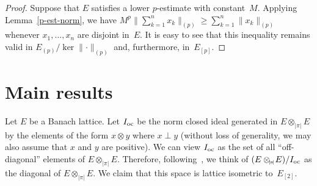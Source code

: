 \documentclass[12pt]{amsart}
\theoremstyle{plain}
\newtheorem{theorem}{Theorem}
\theoremstyle{definition}
\newcommand{\abs}[1]{\lvert#1\rvert}
\newcommand{\norm}[1]{\lVert#1\rVert}
\newcommand{\bignorm}[1]{\bigl\lVert#1\bigr\rVert}
\renewcommand{\ge}{\geqslant}
\def\api{{\abs{\!\pi\!}}}
\def\ftp{\otimes_{\!\scriptscriptstyle\api}\!}
\def\Ioc{I_{\rm oc}}
\begin{document}
\begin{proof}
  Suppose that $E$ satisfies a lower $p$-estimate with constant~$M$.
  Applying Lemma~\ref{p-est-norm}, we have
  \begin{math}
    M^p\bignorm{\sum_{k=1}^nx_k}_{(p)}
    \ge\sum_{k=1}^n\norm{x_k}_{(p)}
  \end{math}
  whenever $x_1,\dots,x_n$ are disjoint in~$E$. It is easy to see that
  this inequality remains valid in $E_{(p)}/\ker\norm{\cdot}_{(p)}$
  and,
  furthermore, in~$E_{[p]}$.
\end{proof}


\section{Main results}

Let $E$ be a Banach lattice. Let $\Ioc$ be the norm closed ideal
generated in $E\ftp E$ by the elements of the form $x\otimes y$ where
$x\perp y$ (without loss of generality, we may also assume that $x$
and $y$ are positive). We can view $\Ioc$ as the set of all
``off-diagonal'' elements of $E\ftp E$. Therefore,
following~\cite{BuskesBu}, we think of $(E\ftp E)/\Ioc$ as the
diagonal of $E\ftp E$. We claim that this space is lattice isometric
to~$E_{[2]}$.
\end{document}

